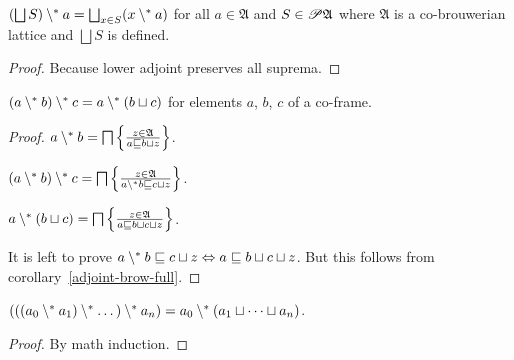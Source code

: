 \begin{thm}
\label{cup-pdiff}$\left(\bigsqcup S\right)\psetminus a=\bigsqcup_{x\in S}(x\psetminus a)$
for all $a\in\mathfrak{A}$ and $S\in\mathscr{P}\mathfrak{A}$ where
$\mathfrak{A}$ is a co-brouwerian lattice and $\bigsqcup S$ is defined.\end{thm}
\begin{proof}
Because lower adjoint preserves all suprema.\end{proof}
\begin{thm}
$(a\setminus^{\ast} b)\setminus^{\ast} c=a\setminus^{\ast}(b\sqcup c)$ for elements
$a$, $b$, $c$ of a co-frame.\end{thm}
\begin{proof}
$a\setminus^{\ast} b=\bigsqcap\left\{ \frac{z\in\mathfrak{A}}{a\sqsubseteq b\sqcup z}\right\}$.

$(a\setminus^{\ast} b)\setminus^{\ast} c=\bigsqcap\left\{ \frac{z\in\mathfrak{A}}{a\setminus^{\ast} b\sqsubseteq c\sqcup z}\right\}$.

$a\setminus^{\ast}(b\sqcup c)=\bigsqcap\left\{ \frac{z\in\mathfrak{A}}{a\sqsubseteq b\sqcup c\sqcup z}\right\}$.

It is left to prove $a\setminus^{\ast} b\sqsubseteq c\sqcup z\Leftrightarrow a\sqsubseteq b\sqcup c\sqcup z$.
But this follows from corollary~\ref{adjoint-brow-full}.\end{proof}
\begin{cor}
$(((a_{0}\setminus^{\ast} a_{1})\setminus^{\ast}\dots)\setminus^{\ast} a_{n})=a_{0}\setminus^{\ast}(a_{1}\sqcup\dots\sqcup a_{n})$.\end{cor}
\begin{proof}
By math induction.
\end{proof}

